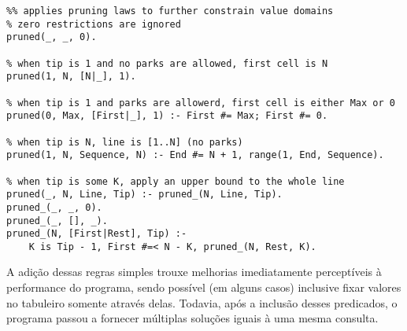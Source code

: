\begin{verbatim}
%% applies pruning laws to further constrain value domains
% zero restrictions are ignored
pruned(_, _, 0).

% when tip is 1 and no parks are allowed, first cell is N
pruned(1, N, [N|_], 1).

% when tip is 1 and parks are allowerd, first cell is either Max or 0
pruned(0, Max, [First|_], 1) :- First #= Max; First #= 0.

% when tip is N, line is [1..N] (no parks)
pruned(1, N, Sequence, N) :- End #= N + 1, range(1, End, Sequence).

% when tip is some K, apply an upper bound to the whole line
pruned(_, N, Line, Tip) :- pruned_(N, Line, Tip).
pruned_(_, _, 0).
pruned_(_, [], _).
pruned_(N, [First|Rest], Tip) :-
    K is Tip - 1, First #=< N - K, pruned_(N, Rest, K).
\end{verbatim}

A adição dessas regras simples trouxe melhorias imediatamente perceptíveis à performance do programa, sendo possível (em alguns casos) inclusive fixar valores no tabuleiro somente através delas.
Todavia, após a inclusão desses predicados, o programa passou a fornecer múltiplas soluções iguais à uma mesma consulta.
